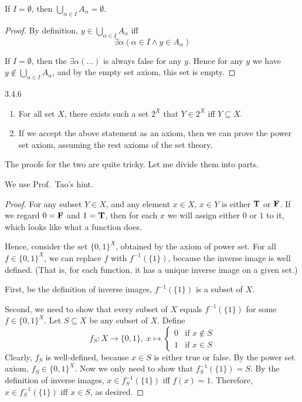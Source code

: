 \begin{why}{50}
	If $I = \emptyset$, then $\bigcup_{\alpha \in I}A_\alpha = \emptyset$.
\end{why}
\begin{proof}
	By definition, $y \in \bigcup_{\alpha \in I}A_\alpha$ iff
	\[
		\exists \alpha (\alpha \in I \wedge y \in A_\alpha)
	\]
	
	If $I = \emptyset$, then the $\exists \alpha(\dots)$ is always false for any $y$. Hence for any $y$ we have $y \notin \bigcup_{\alpha \in I}A_\alpha$, and by the empty set axiom, this set is empty.
\end{proof}

\begin{exercise}{3.4.6}
	\begin{enumerate}
		\item For all set $X$, there exists such a set $2^X$ that $Y \in 2^X$ iff $Y \subseteq X$.
		\item If we accept the above statement as an axiom, then we can prove the power set axiom, assuming the rest axioms of the set theory.
	\end{enumerate}
\end{exercise}
The proofs for the two are quite tricky. Let me divide them into parts.

 We use Prof.~Tao's hint.
\begin{proof}
	For any subset $Y \in X$, and any element $x \in X$, $x \in Y$ is either $\mathbf{T}$ or $\mathbf{F}$. If we regard $0 = \mathbf{F}$ and $1 = \mathbf{T}$, then for each $x$ we will assign either $0$ or $1$ to it, which looks like what a function does.

	Hence,  consider the set $\{0,1\}^X$, obtained by the axiom of power set. For all $f \in \{0,1\}^X$, we can replace $f$ with $f^{-1}(\{1\})$, because the inverse image is well defined. (That is, for each function, it has a unique inverse image on a given set.)
	
	First, be the definition of inverse images, $f^{-1}(\{1\})$ is a subset of $X$.
	
	Second, we need to show that every subset of $X$ equals $f^{-1}(\{1\})$ for some $f \in \{0,1\}^X$. Let $S \subseteq X$ be any subset of $X$. Define
	\[
	f_S: X \to \{0,1\},\ x \mapsto
	\begin{cases}
		0 & \text{if } x \notin S \\
		1 & \text{if } x \in S
	\end{cases}
	\]
	Clearly, $f_S$ is well-defined, because $x \in S$ is either true or false. By the power set axiom, $f_S \in \{0,1\}^X$. Now we only need to show that $f_S^{-1}(\{1\}) = S$.	By the definition of inverse images, $x \in f_S^{-1}(\{1\})$ iff $f(x) = 1$. Therefore, $x \in f_S^{-1}(\{1\})$ iff $x \in S$, as desired.
\end{proof}


